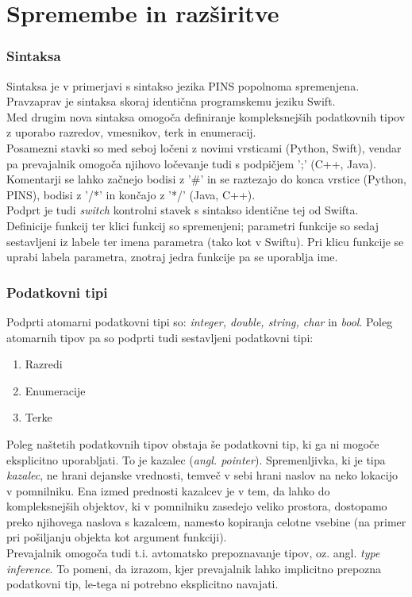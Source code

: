 \documentclass[a4paper, 12pt]{book}
\begin{document}
\section{Spremembe in razširitve}

\subsubsection{Sintaksa}

Sintaksa je v primerjavi s sintakso jezika PINS popolnoma spremenjena. Pravzaprav je sintaksa skoraj identična programskemu jeziku Swift. \\
\indent Med drugim nova sintaksa omogoča definiranje kompleksnejših podatkovnih tipov z uporabo razredov, vmesnikov, terk in enumeracij. \\
\indent Posamezni stavki so med seboj ločeni z novimi vrsticami (Python, Swift), vendar pa prevajalnik omogoča njihovo ločevanje tudi s podpičjem ';' (C++, Java). \\
\indent Komentarji se lahko začnejo bodisi z '\#' in se raztezajo do konca vrstice (Python, PINS), bodisi z '/*' in končajo z '*/' (Java, C++). \\
\indent Podprt je tudi \textit{switch} kontrolni stavek s sintakso identične tej od Swifta.\\
\indent Definicije funkcij ter klici funkcij so spremenjeni; parametri funkcije so sedaj sestavljeni iz labele ter imena parametra (tako kot v Swiftu). Pri klicu funkcije se uprabi labela parametra, znotraj jedra funkcije pa se uporablja ime.

\subsubsection{Podatkovni tipi}

Podprti atomarni podatkovni tipi so: \textit{integer, double, string, char} in \textit{bool}. Poleg atomarnih tipov pa so podprti tudi sestavljeni podatkovni tipi:

\begin{enumerate}
	\item Razredi
	\item Enumeracije
	\item Terke
\end{enumerate}

Poleg naštetih podatkovnih tipov obstaja še podatkovni tip, ki ga ni mogoče eksplicitno uporabljati. To je kazalec (\textit{angl. pointer}). Spremenljivka, ki je tipa \textit{kazalec}, ne hrani dejanske vrednosti, temveč v sebi hrani naslov na neko lokacijo v pomnilniku. Ena izmed prednosti kazalcev je v tem, da lahko do kompleksnejših objektov, ki v pomnilniku zasedejo veliko prostora, dostopamo preko njihovega naslova s kazalcem, namesto kopiranja celotne vsebine (na primer pri pošiljanju objekta kot argument funkciji). \\
\indent Prevajalnik omogoča tudi t.i. avtomatsko prepoznavanje tipov, oz. angl. \textit{type inference}. To pomeni, da izrazom, kjer prevajalnik lahko implicitno prepozna podatkovni tip, le-tega ni potrebno eksplicitno navajati.
\end{document}
